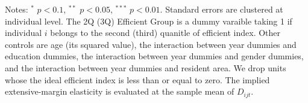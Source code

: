 \documentclass[ review  , 3p ]{elsarticle}
\begin{document}
\begin{table}
\begin{threeparttable}
  \begin{tablenotes}
  \item Notes: $^{*}$ $p < 0.1$, $^{**}$ $p < 0.05$, $^{***}$ $p < 0.01$. Standard errors are clustered at individual level. The 2Q (3Q) Efficient Group is a dummy varaible taking 1 if individual $i$ belongs to the second (third) quanitle of efficient index. Other controls are age (its squared value), the interaction between year dummies and education dummies, the interaction between year dummies and gender dummies, and the interaction between year dummies and resident area. We drop units whose the ideal efficient index is less than or equal to zero. The implied extensive-margin elasticity is evaluated at the sample mean of $D_{ijt}$.
  \end{tablenotes}
  \end{threeparttable}
  \end{table}
  
\end{document}
